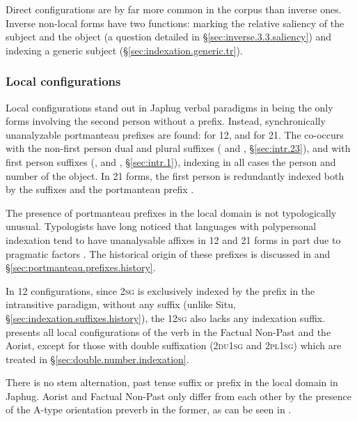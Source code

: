 Direct configurations are by far more common in the corpus than inverse ones. Inverse non-local forms have two functions: marking the relative saliency of the subject and the object (a question detailed in §\ref{sec:inverse.3.3.saliency}) and indexing a generic subject (§\ref{sec:indexation.generic.tr}).

\subsubsection{Local configurations} \label{sec:indexation.local}
Local configurations stand out in Japhug verbal paradigms in being the only forms involving the second person without a  prefix. Instead, synchronically unanalyzable portmanteau prefixes are found:  for 1\fl{}2, and  for 2\fl{}1. The  co-occurs with the non-first person dual and plural suffixes ( and , §\ref{sec:intr.23}), and  with first person suffixes (,  and , §\ref{sec:intr.1}), indexing in all cases the person and number of the object. In 2\fl{}1 forms, the first person is redundantly indexed both by the suffixes and the portmanteau prefix . 

The presence of portmanteau prefixes in the local domain is not typologically unusual. Typologists have long noticed that languages with polypersonal indexation tend to have unanalysable affixes in 1\fl{}2 and 2\fl{}1 forms \citep{heath98skewing} in part due to pragmatic factors \citep{delancey18sociopragmatic}. The historical origin of these prefixes is discussed in \citet{jacques18generic} and §\ref{sec:portmanteau.prefixes.history}.

In 1\fl{}2 configurations, since \textsc{2sg} is exclusively indexed by the  prefix in the intransitive paradigm, without any suffix (unlike Situ, §\ref{sec:indexation.suffixes.history}), the 1\fl{}\textsc{2sg} also lacks any indexation suffix.  presents all local configurations of the verb  in the Factual Non-Past and the Aorist, except for those with double suffixation (\textsc{2du}\fl{}\textsc{1sg} and \textsc{2pl}\fl{}\textsc{1sg}) which are treated in §\ref{sec:double.number.indexation}. 

There is no stem alternation,  past tense suffix or  prefix in the local domain in Japhug. Aorist and Factual Non-Past only differ from each other by the presence of the A-type orientation preverb in the former, as can be seen in .

